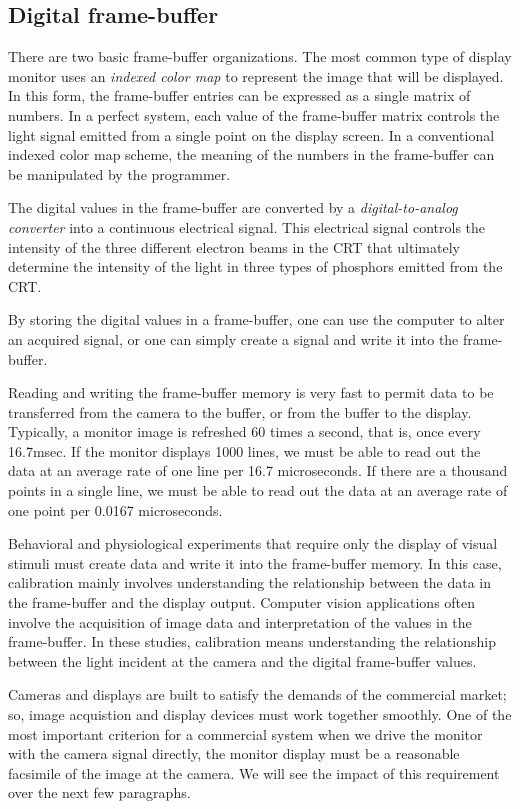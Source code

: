 \subsection*{Digital frame-buffer}


There are two basic frame-buffer organizations.  The most common type
of display monitor uses an {\em indexed color map} to represent the
image that will be displayed.  In this form, the frame-buffer entries
can be expressed as a single matrix of numbers.  In a perfect system,
each value of the frame-buffer matrix controls the light signal
emitted from a single point on the display screen.  In a conventional
indexed color map scheme, the meaning of the numbers in the
frame-buffer can be manipulated by the programmer.


The digital values in the frame-buffer are converted by a 
{\em digital-to-analog converter} into a continuous
electrical signal.
This electrical signal controls the intensity of the three different
electron beams in the CRT that ultimately determine the intensity of
the light in three types of phosphors emitted from the CRT.


By storing the digital values in a frame-buffer,
one can use the computer to alter an acquired signal,
or one can simply create a signal and write it into the frame-buffer.

Reading and writing the frame-buffer memory is very fast
to permit data to be transferred from the camera to the buffer,
or from the buffer to the display.
Typically, a monitor image is refreshed
$60$ times a second, that is, once every 16.7msec.
If the monitor displays 1000 lines, we must
be able to read out the data
at an average rate of one line per 16.7 microseconds.
If there are a thousand points in a single line,
we must be able to read out the data
at an average rate of one point per 0.0167 microseconds.

Behavioral and physiological experiments that
require only the display of visual stimuli
must create data and write it into the frame-buffer memory.
In this case, calibration mainly involves
understanding the relationship between the
data in the frame-buffer and the display output.
Computer vision applications often involve the
acquisition of image data and interpretation
of the values in the frame-buffer.
In these studies,
calibration means understanding the
relationship between the light incident at the camera
and the digital frame-buffer values.

Cameras and displays are built
to satisfy the demands of the commercial market;
so, image acquistion and display devices must work together smoothly.
One of the most important criterion
for a commercial system
when we drive the monitor with the camera signal
directly, the monitor display
must be a reasonable facsimile of the image at the camera.
We will see the impact of this requirement
over the next few paragraphs.

